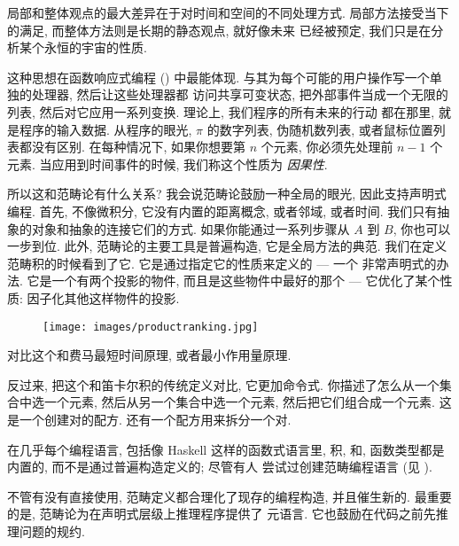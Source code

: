局部和整体观点的最大差异在于对时间和空间的不同处理方式. 局部方法接受当下的满足, 而整体方法则是长期的静态观点, 就好像未来
已经被预定, 我们只是在分析某个永恒的宇宙的性质.

这种思想在函数响应式编程 () 中最能体现. 与其为每个可能的用户操作写一个单独的处理器, 然后让这些处理器都
访问共享可变状态,  把外部事件当成一个无限的列表, 然后对它应用一系列变换. 理论上, 我们程序的所有未来的行动
都在那里, 就是程序的输入数据. 从程序的眼光, $\pi$ 的数字列表, 伪随机数列表, 或者鼠标位置列表都没有区别. 在每种情况下,
如果你想要第 $n$ 个元素, 你必须先处理前 $n-1$ 个元素. 当应用到时间事件的时候, 我们称这个性质为 \emph{因果性}.

所以这和范畴论有什么关系? 我会说范畴论鼓励一种全局的眼光, 因此支持声明式编程. 首先, 不像微积分, 它没有内置的距离概念,
或者邻域, 或者时间. 我们只有抽象的对象和抽象的连接它们的方式. 如果你能通过一系列步骤从 $A$ 到 $B$, 你也可以一步到位.
此外, 范畴论的主要工具是普遍构造, 它是全局方法的典范. 我们在定义范畴积的时候看到了它. 它是通过指定它的性质来定义的 --- 一个
非常声明式的办法. 它是一个有两个投影的物件, 而且是这些物件中最好的那个 --- 它优化了某个性质: 因子化其他这样物件的投影.

\begin{figure}[H]
  \centering
  \texttt{[image: images/productranking.jpg]}
\end{figure}

\noindent
对比这个和费马最短时间原理, 或者最小作用量原理.

反过来, 把这个和笛卡尔积的传统定义对比, 它更加命令式. 你描述了怎么从一个集合中选一个元素, 然后从另一个集合中选一个元素,
然后把它们组合成一个元素. 这是一个创建对的配方. 还有一个配方用来拆分一个对.

在几乎每个编程语言, 包括像 Haskell 这样的函数式语言里, 积, 和, 函数类型都是内置的, 而不是通过普遍构造定义的; 尽管有人
尝试过创建范畴编程语言 (见 ).

不管有没有直接使用, 范畴定义都合理化了现存的编程构造, 并且催生新的. 最重要的是, 范畴论为在声明式层级上推理程序提供了
元语言. 它也鼓励在代码之前先推理问题的规约.
